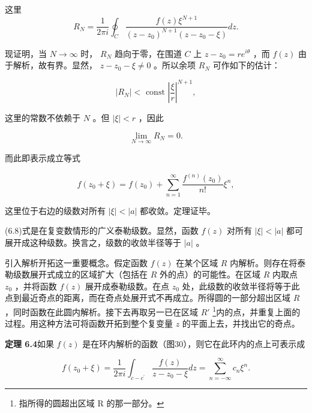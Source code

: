这里
\begin{equation*}
R _ {N} = \frac {1}{2 \pi i} \oint_ {C} \frac {f (z) \xi^ {N + 1}}{\left(z - z _ {0}\right) ^ {N + 1} \left(z - z _ {0} - \xi\right)} d z.
\end{equation*}

现证明，当 $N\to \infty$ 时， $R_{N}$ 趋向于零，在围道 $C$ 上 $z - z_0 = re^{i\theta}$ ，而 $f(z)$ 由于解析，故有界。显然， $z - z_0 - \xi \neq 0$ 。所以余项 $R_N$ 可作如下的估计：

\begin{equation*}
\left| R _ {N} \right| <   \text { const } \left| \frac {\xi}{r} \right| ^ {N + 1},
\end{equation*}

这里的常数不依赖于 $N$ 。但 $|\xi| < r$ ，因此

\begin{equation*}
\lim _ {N \rightarrow \infty} R _ {N} = 0.
\end{equation*}

而此即表示成立等式

\begin{equation*}
f (z _ {0} + \xi) = f (z _ {0}) + \sum_ {n = 1} ^ {\infty} \frac {f ^ {(n)} (z _ {0})}{n !} \xi^ {n},\tag{6.8}
\end{equation*}

这里位于右边的级数对所有 $|\xi| < |a|$ 都收敛。定理证毕。

(6.8)式是在复变数情形的广义泰勒级数。显然，函数 $f(z)$ 对所有 $|\xi|<|a|$ 都可展开成这种级数。换言之，级数的收敛半径等于 $|a|$ 。

引入解析开拓这一重要概念。假定函数 $f(z)$ 在某个区域 $R$ 内解析。则存在将泰勒级数展开式成立的区域扩大（包括在 $R$ 外的点）的可能性。在区域 $R$ 内取点 $z_0$ ，并将函数 $f(z)$ 展开成泰勒级数。在点 $z_0$ 处，此级数的收敛半径将等于此点到最近奇点的距离，而在奇点处展开式不再成立。所得圆的一部分超出区域 $R$ ，同时函数在此圆内解析。接下去再取另一已在区域 $R'$ \footnote{指所得的圆超出区域 R 的那一部分。}内的点，并重复上面的过程。用这种方法可将函数开拓到整个复变量 $z$ 的平面上去，并找出它的奇点。

\textbf{定理 6.4}\quad 如果 $f(z)$ 是在环内解析的函数（图30），则它在此环内的点上可表示成

\begin{equation*}
f (z _ {0} + \xi) = \frac {1}{2 \pi i} \int_ {c - c ^ {\prime}} \frac {f (z)}{z - z _ {0} - \xi} d z = \sum_ {n = - \infty} ^ {\infty} c _ {n} \xi^ {n}.\tag{6.9}
\end{equation*}


